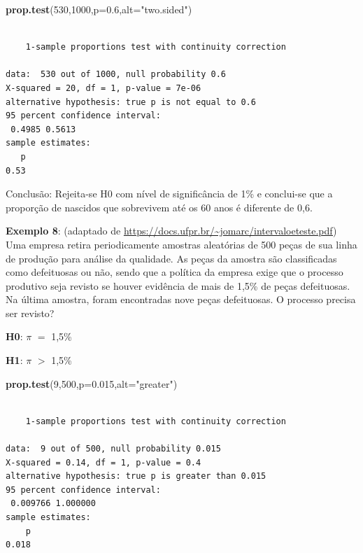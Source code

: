 \documentclass[12pt,brazil,]{book}
\newenvironment{Shaded}{\begin{snugshade}}{\end{snugshade}}
\newcommand{\DataTypeTok}[1]{\textcolor[rgb]{0.13,0.29,0.53}{#1}}
\newcommand{\DecValTok}[1]{\textcolor[rgb]{0.00,0.00,0.81}{#1}}
\newcommand{\FloatTok}[1]{\textcolor[rgb]{0.00,0.00,0.81}{#1}}
\newcommand{\KeywordTok}[1]{\textcolor[rgb]{0.13,0.29,0.53}{\textbf{#1}}}
\newcommand{\NormalTok}[1]{#1}
\newcommand{\StringTok}[1]{\textcolor[rgb]{0.31,0.60,0.02}{#1}}
\begin{document}
\begin{Shaded}
\begin{Highlighting}[]
\KeywordTok{prop.test}\NormalTok{(}\DecValTok{530}\NormalTok{,}\DecValTok{1000}\NormalTok{,}\DataTypeTok{p=}\FloatTok{0.6}\NormalTok{,}\DataTypeTok{alt=}\StringTok{"two.sided"}\NormalTok{)}
\end{Highlighting}
\end{Shaded}

\begin{verbatim}

    1-sample proportions test with continuity correction

data:  530 out of 1000, null probability 0.6
X-squared = 20, df = 1, p-value = 7e-06
alternative hypothesis: true p is not equal to 0.6
95 percent confidence interval:
 0.4985 0.5613
sample estimates:
   p 
0.53 
\end{verbatim}

Conclusão: Rejeita-se H0 com nível de significância de 1\% e conclui-se
que a proporção de nascidos que sobrevivem até os 60 anos é diferente de
0,6.

\textbf{Exemplo 8}: (adaptado de
\url{https://docs.ufpr.br/~jomarc/intervaloeteste.pdf}) Uma empresa
retira periodicamente amostras aleatórias de 500 peças de sua linha de
produção para análise da qualidade. As peças da amostra são
classificadas como defeituosas ou não, sendo que a política da empresa
exige que o processo produtivo seja revisto se houver evidência de mais
de 1,5\% de peças defeituosas. Na última amostra, foram encontradas nove
peças defeituosas. O processo precisa ser revisto?

\textbf{H0}: \(\pi\) \(=\) 1,5\%

\textbf{H1}: \(\pi\) \(>\) 1,5\%

\begin{Shaded}
\begin{Highlighting}[]
\KeywordTok{prop.test}\NormalTok{(}\DecValTok{9}\NormalTok{,}\DecValTok{500}\NormalTok{,}\DataTypeTok{p=}\FloatTok{0.015}\NormalTok{,}\DataTypeTok{alt=}\StringTok{"greater"}\NormalTok{)}
\end{Highlighting}
\end{Shaded}

\begin{verbatim}

    1-sample proportions test with continuity correction

data:  9 out of 500, null probability 0.015
X-squared = 0.14, df = 1, p-value = 0.4
alternative hypothesis: true p is greater than 0.015
95 percent confidence interval:
 0.009766 1.000000
sample estimates:
    p 
0.018 
\end{verbatim}
\end{document}
